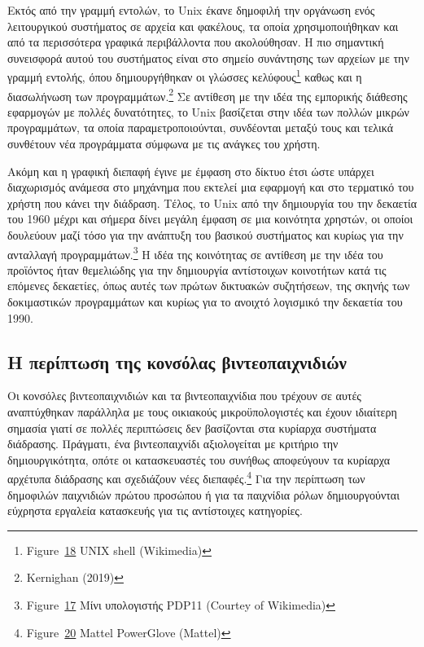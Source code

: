 \documentclass[
]{article}
\begin{document}
Εκτός από την γραμμή εντολών, το Unix έκανε δημοφιλή την οργάνωση ενός
λειτουργικού συστήματος σε αρχεία και φακέλους, τα οποία
χρησιμοποιήθηκαν και από τα περισσότερα γραφικά περιβάλλοντα που
ακολούθησαν. Η πιο σημαντική συνεισφορά αυτού του συστήματος είναι στο
σημείο συνάντησης των αρχείων με την γραμμή εντολής, όπου δημιουργήθηκαν
οι γλώσσες κελύφους\footnote{Figure~\protect\hyperlink{fig:unix-shell}{18}
  UNIX shell (Wikimedia)} καθως και η διασωλήνωση των
προγραμμάτων.\footnote{Kernighan (2019)} Σε αντίθεση με την ιδέα της
εμπορικής διάθεσης εφαρμογών με πολλές δυνατότητες, το Unix βασίζεται
στην ιδέα των πολλών μικρών προγραμμάτων, τα οποία παραμετροποιούνται,
συνδέονται μεταξύ τους και τελικά συνθέτουν νέα προγράμματα σύμφωνα με
τις ανάγκες του χρήστη.

Ακόμη και η γραφική διεπαφή έγινε με έμφαση στο δίκτυο έτσι ώστε υπάρχει
διαχωρισμός ανάμεσα στο μηχάνημα που εκτελεί μια εφαρμογή και στο
τερματικό του χρήστη που κάνει την διάδραση. Τέλος, το Unix από την
δημιουργία του την δεκαετία του 1960 μέχρι και σήμερα δίνει μεγάλη
έμφαση σε μια κοινότητα χρηστών, οι οποίοι δουλεύουν μαζί τόσο για την
ανάπτυξη του βασικού συστήματος και κυρίως για την ανταλλαγή
προγραμμάτων.\footnote{Figure~\protect\hyperlink{fig:pdp11-tty-unix}{17}
  Μίνι υπολογιστής PDP11 (Courtey of Wikimedia)} Η ιδέα της κοινότητας
σε αντίθεση με την ιδέα του προϊόντος ήταν θεμελιώδης για την δημιουργία
αντίστοιχων κοινοτήτων κατά τις επόμενες δεκαετίες, όπως αυτές των
πρώτων δικτυακών συζητήσεων, της σκηνής των δοκιμαστικών προγραμμάτων
και κυρίως για το ανοιχτό λογισμικό την δεκαετία του 1990.

\hypertarget{ux3b7-ux3c0ux3b5ux3c1ux3afux3c0ux3c4ux3c9ux3c3ux3b7-ux3c4ux3b7ux3c2-ux3baux3bfux3bdux3c3ux3ccux3bbux3b1ux3c2-ux3b2ux3b9ux3bdux3c4ux3b5ux3bfux3c0ux3b1ux3b9ux3c7ux3bdux3b9ux3b4ux3b9ux3ceux3bd}{%
\subsection{Η περίπτωση της κονσόλας
βιντεοπαιχνιδιών}\label{ux3b7-ux3c0ux3b5ux3c1ux3afux3c0ux3c4ux3c9ux3c3ux3b7-ux3c4ux3b7ux3c2-ux3baux3bfux3bdux3c3ux3ccux3bbux3b1ux3c2-ux3b2ux3b9ux3bdux3c4ux3b5ux3bfux3c0ux3b1ux3b9ux3c7ux3bdux3b9ux3b4ux3b9ux3ceux3bd}}

Οι κονσόλες βιντεοπαιχνιδιών και τα βιντεοπαιχνίδια που τρέχουν σε αυτές
αναπτύχθηκαν παράλληλα με τους οικιακούς μικροϋπολογιστές και έχουν
ιδιαίτερη σημασία γιατί σε πολλές περιπτώσεις δεν βασίζονται στα
κυρίαρχα συστήματα διάδρασης. Πράγματι, ένα βιντεοπαιχνίδι αξιολογείται
με κριτήριο την δημιουργικότητα, οπότε οι κατασκευαστές του συνήθως
αποφεύγουν τα κυρίαρχα αρχέτυπα διάδρασης και σχεδιάζουν νέες
διεπαφές.\footnote{Figure~\protect\hyperlink{fig:power-glove}{20} Mattel
  PowerGlove (Mattel)} Για την περίπτωση των δημοφιλών παιχνιδιών πρώτου
προσώπου ή για τα παιχνίδια ρόλων δημιουργούνται εύχρηστα εργαλεία
κατασκευής για τις αντίστοιχες κατηγορίες.
\end{document}
